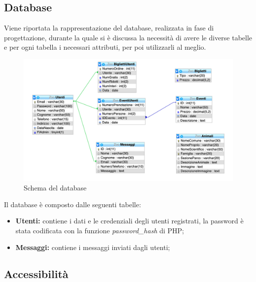     \subsection{Database}
    Viene riportata la rappresentazione del database, realizzata in fase di progettazione, durante la quale si è discussa la necessità di avere le diverse tabelle e per ogni tabella i necessari attributi, per poi utilizzarli al meglio.
    \begin{figure}[H]
        \centering
        \includegraphics[width=15cm]{./img/database.png}
        \caption{Schema del database}  \label{fig:xray}
    \end{figure}
    Il database è composto dalle seguenti tabelle:
    \begin{itemize}
        \item \textbf{Utenti:} contiene i dati e le credenziali degli utenti registrati, la password è stata codificata con la funzione \textit{password\_hash} di PHP;
        \item \textbf{Messaggi:} contiene i messaggi inviati dagli utenti;
    \end{itemize}

    \subsection{Accessibilità}

\pagebreak